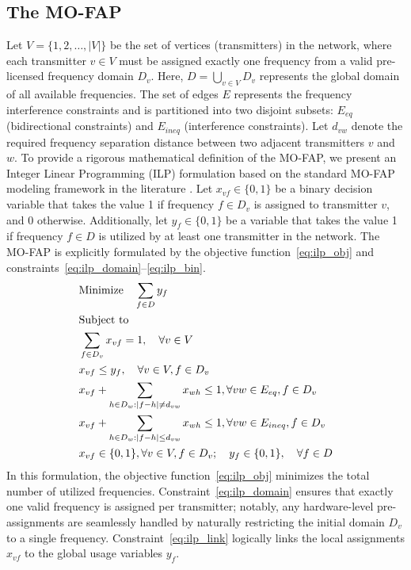 \documentclass[letterpaper,journal]{IEEEtran}
\begin{document}
\subsection{The MO-FAP}
Let $V=\{1, 2, \dots, |V|\}$ be the set of vertices (transmitters) in the network, where each transmitter $v \in V$ must be assigned exactly one frequency from a valid pre-licensed frequency domain $D_v$. 
Here, $D = \bigcup_{v \in V} D_v$ represents the global domain of all available frequencies. 
The set of edges $E$ represents the frequency interference constraints and is partitioned into two disjoint subsets: $E_{eq}$ (bidirectional constraints) and $E_{ineq}$ (interference constraints). 
Let $d_{vw}$ denote the required frequency separation distance between two adjacent transmitters $v$ and $w$.
To provide a rigorous mathematical definition of the MO-FAP, we present an Integer Linear Programming (ILP) formulation based on the standard MO-FAP modeling framework in the literature \cite{Aardal2007}.
Let $x_{vf} \in \{0, 1\}$ be a binary decision variable that takes the value 1 if frequency $f \in D_v$ is assigned to transmitter $v$, and 0 otherwise. 
Additionally, let $y_f \in \{0, 1\}$ be a variable that takes the value 1 if frequency $f \in D$ is utilized by at least one transmitter in the network. 
The MO-FAP is explicitly formulated by the objective function~\eqref{eq:ilp_obj} and constraints~\eqref{eq:ilp_domain}--\eqref{eq:ilp_bin}.
\begin{align} 
    & \text{Minimize} \quad \sum_{f \in D} y_f \label{eq:ilp_obj} \\
    & \text{Subject to} \notag \\
    & \sum_{f \in D_v} x_{vf} = 1, \quad \forall v \in V \label{eq:ilp_domain} \\
    & x_{vf} \le y_f, \quad \forall v \in V, f \in D_v \label{eq:ilp_link} \\
    & x_{vf} + \sum_{h \in D_w : |f - h| \neq d_{vw}} x_{wh} \le 1, \forall vw \in E_{eq}, f \in D_v \label{eq:ilp_exact} \\
    & x_{vf} + \sum_{h \in D_w : |f - h| \le d_{vw}} x_{wh} \le 1, \forall vw \in E_{ineq}, f \in D_v \label{eq:ilp_ineq} \\
    & x_{vf} \in \{0, 1\}, \forall v \in V, f \in D_v; \quad y_f \in \{0, 1\}, \quad \forall f \in D \label{eq:ilp_bin}
\end{align}
In this formulation, the objective function~\eqref{eq:ilp_obj} minimizes the total number of utilized frequencies. Constraint~\eqref{eq:ilp_domain} ensures that exactly one valid frequency is assigned per transmitter; notably, any hardware-level pre-assignments are seamlessly handled by naturally restricting the initial domain $D_v$ to a single frequency. Constraint~\eqref{eq:ilp_link} logically links the local assignments $x_{vf}$ to the global usage variables $y_f$. 
\end{document}
